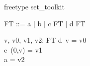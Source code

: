 \documentclass{article}
\begin{document}
\begin{zsection}
\SECTION freetype \parents set\_toolkit
\end{zsection}

\begin{zed}
   FT ::= a | b | c \ldata \nat \cross FT \rdata | d \ldata FT \rdata
\end{zed}

\begin{axdef}
   v, v0, v1, v2: FT
\where
   d~v     = v0 \\
   c~(0,v) = v1 \\
   a       = v2 
\end{axdef}
\end{document}
